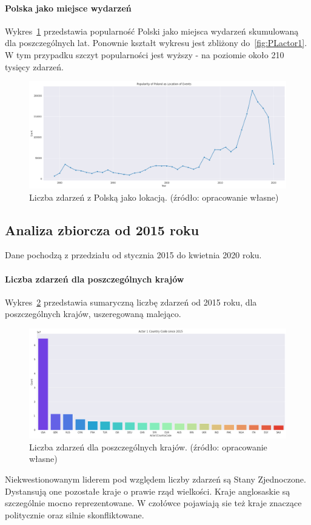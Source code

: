 \documentclass[11pt]{report}
\begin{document}
    \paragraph{Polska jako miejsce wydarzeń}
    Wykres~\ref{fig:PLlocation} przedstawia popularność Polski jako miejsca wydarzeń skumulowaną dla poszczególnych lat. Ponownie kształt wykresu jest zbliżony do~\ref{fig:PLactor1}. W tym przypadku szczyt popularności jest wyższy - na poziomie około 210 tysięcy zdarzeń.
    \begin{figure}[!htp]
        \centering
        \includegraphics[width=1 \textwidth]{fig/PL/PLlocation.png}
        \caption{Liczba zdarzeń z Polską jako lokacją. (źródło: opracowanie własne)}
        \label{fig:PLlocation}
    \end{figure}

    \subsection{Analiza zbiorcza od 2015 roku}
    Dane pochodzą z przedziału od stycznia 2015 do kwietnia 2020 roku.

    \paragraph{Liczba zdarzeń dla poszczególnych krajów}
    Wykres~\ref{fig:GLOBALactor1} przedstawia sumaryczną liczbę zdarzeń od 2015 roku, dla poszczególnych krajów, uszeregowaną malejąco.
    \begin{figure}[!htp]
        \centering
        \includegraphics[width=1 \textwidth]{fig/GLOBAL/Actor1.png}
        \caption{Liczba zdarzeń dla poszczególnych krajów. (źródło: opracowanie własne)}
        \label{fig:GLOBALactor1}
    \end{figure}
    Niekwestionowanym liderem pod względem liczby zdarzeń są Stany Zjednoczone. Dystansują one pozostałe kraje o prawie rząd wielkości.
    Kraje anglosaskie są szczególnie mocno reprezentowane.
    W czołówce pojawiają sie też kraje znaczące politycznie oraz silnie skonfliktowane.
\end{document}
